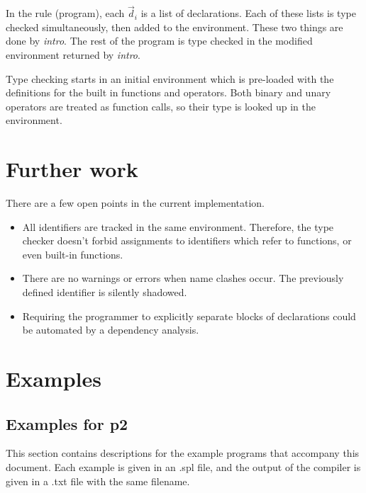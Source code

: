 \documentclass[a4paper]{article}
\begin{document}
In the rule (program), each $\vec{d}_i$ is a list of declarations.  Each of
these lists is type checked simultaneously, then added to the environment.
These two things are done by \emph{intro}.  The rest of the program is type
checked in the modified environment returned by \emph{intro}.

Type checking starts in an initial environment which is pre-loaded with the
definitions for the built in functions and operators.  Both binary and unary
operators are treated as function calls, so their type is looked up in the
environment.

\section{Further work}

There are a few open points in the current implementation.

\begin{itemize}

  \item All identifiers are tracked in the same environment.  Therefore, the
  type checker doesn't forbid assignments to identifiers which refer to
  functions, or even built-in functions.

  \item There are no warnings or errors when name clashes occur.  The previously
  defined identifier is silently shadowed.

  \item Requiring the programmer to explicitly separate blocks of declarations
  could be automated by a dependency analysis.

\end{itemize}


\section{Examples}

\subsection{Examples for p2}

This section contains descriptions for the example programs that accompany this
document.  Each example is given in an .spl file, and the output of the compiler
is given in a .txt file with the same filename.
\end{document}
